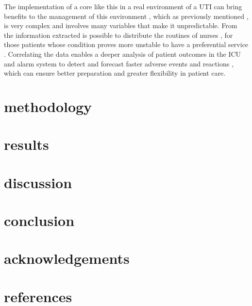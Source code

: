 \documentclass[a4paper,11pt]{article}
\begin{document}
  The implementation of a core like this in a real environment of a UTI can bring benefits to the management of this environment , which as previously mentioned , is very complex and involves many variables that make it unpredictable. From the information extracted is possible to distribute the routines of nurses , for those patients whose condition proves more unstable to have a preferential service . Correlating the data enables a deeper analysis of patient outcomes in the ICU and alarm system to detect and forecast faster adverse events and reactions , which can ensure better preparation and greater flexibility in patient care.
  
\section{methodology}

\section{results}

\section{discussion}

\section{conclusion}

\section{acknowledgements}

\section{references}
\end{document}
